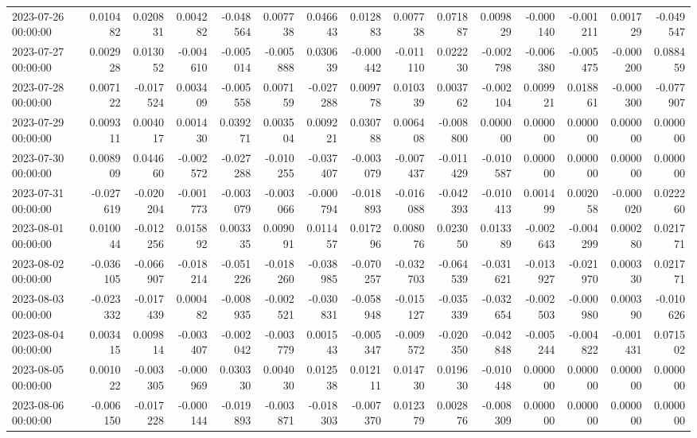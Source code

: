 \begin{tabular}{lrrrrrrrrrrrrrr}
2023-07-26 00:00:00 & 0.010482 & 0.020831 & 0.004282 & -0.048564 & 0.007738 & 0.046643 & 0.012883 & 0.007738 & 0.071887 & 0.009829 & -0.000140 & -0.001211 & 0.001729 & -0.049547 \\
2023-07-27 00:00:00 & 0.002928 & 0.013052 & -0.004610 & -0.005014 & -0.005888 & 0.030639 & -0.000442 & -0.011110 & 0.022230 & -0.002798 & -0.006380 & -0.005475 & -0.000200 & 0.088459 \\
2023-07-28 00:00:00 & 0.007122 & -0.017524 & 0.003409 & -0.005558 & 0.007159 & -0.027288 & 0.009778 & 0.010339 & 0.003762 & -0.002104 & 0.009921 & 0.018861 & -0.000300 & -0.077907 \\
2023-07-29 00:00:00 & 0.009311 & 0.004017 & 0.001430 & 0.039271 & 0.003504 & 0.009221 & 0.030788 & 0.006408 & -0.008800 & 0.000000 & 0.000000 & 0.000000 & 0.000000 & 0.000000 \\
2023-07-30 00:00:00 & 0.008909 & 0.044660 & -0.002572 & -0.027288 & -0.010255 & -0.037407 & -0.003079 & -0.007437 & -0.011429 & -0.010587 & 0.000000 & 0.000000 & 0.000000 & 0.000000 \\
2023-07-31 00:00:00 & -0.027619 & -0.020204 & -0.001773 & -0.003079 & -0.003066 & -0.000794 & -0.018893 & -0.016088 & -0.042393 & -0.010413 & 0.001499 & 0.002058 & -0.000020 & 0.022260 \\
2023-08-01 00:00:00 & 0.010044 & -0.012256 & 0.015892 & 0.003335 & 0.009091 & 0.011457 & 0.017296 & 0.008076 & 0.023050 & 0.013389 & -0.002643 & -0.004299 & 0.000280 & 0.021771 \\
2023-08-02 00:00:00 & -0.036105 & -0.066907 & -0.018214 & -0.051226 & -0.018260 & -0.038985 & -0.070257 & -0.032703 & -0.064539 & -0.031621 & -0.013927 & -0.021970 & 0.000330 & 0.021771 \\
2023-08-03 00:00:00 & -0.023332 & -0.017439 & 0.000482 & -0.008935 & -0.002521 & -0.030831 & -0.058948 & -0.015127 & -0.035339 & -0.032654 & -0.002503 & -0.000980 & 0.000390 & -0.010626 \\
2023-08-04 00:00:00 & 0.003415 & 0.009814 & -0.003407 & -0.002042 & -0.003779 & 0.001543 & -0.005347 & -0.009572 & -0.020350 & -0.042848 & -0.005244 & -0.004822 & -0.001431 & 0.071502 \\
2023-08-05 00:00:00 & 0.001022 & -0.003305 & -0.000969 & 0.030330 & 0.004030 & 0.012538 & 0.012111 & 0.014730 & 0.019630 & -0.010448 & 0.000000 & 0.000000 & 0.000000 & 0.000000 \\
2023-08-06 00:00:00 & -0.006150 & -0.017228 & -0.000144 & -0.019893 & -0.003871 & -0.018303 & -0.007370 & 0.012379 & 0.002876 & -0.008309 & 0.000000 & 0.000000 & 0.000000 & 0.000000 \\

\end{tabular}
